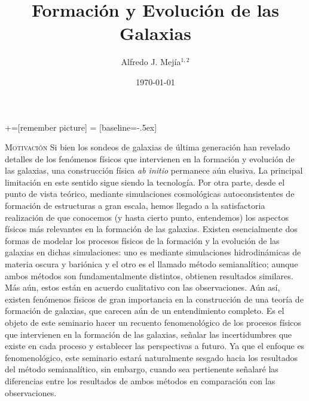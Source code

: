 \documentclass[xcolor=dvipsnames,4pt,hyperref={colorlinks,citecolor=black,linkcolor=black,urlcolor=black}]{beamer}
\begin{document}
+=[remember picture]
 = [baseline=-.5ex]

\begin{frame}
\title{Formación y Evolución de las Galaxias}
\author{Alfredo J. Mej\'ia$^{1,2}$}

\date{\today}


\maketitle
\end{frame}

\begin{frame}[allowframebreaks]{\textsc{Motivación}}
%
Si bien los sondeos de galaxias de última generación han revelado detalles de los fenómenos físicos
que intervienen en la formación y evolución de las galaxias, una construcción física \emph{ab
initio} permanece aún elusiva. La principal limitación en este sentido sigue siendo la tecnología.
Por otra parte, desde el punto de vista teórico, mediante simulaciones cosmológicas autoconsistentes
de formación de estructuras a gran escala, hemos llegado a la satisfactoria realización de que
conocemos (y hasta cierto punto, entendemos) los aspectos físicos más relevantes en la formación de
las galaxias. Existen esencialmente dos formas de modelar los procesos físicos de la formación y la
evolución de las galaxias en dichas simulaciones: uno es mediante simulaciones hidrodinámicas de
materia oscura y bariónica y el otro es el llamado método semianalítico; aunque ambos métodos son
fundamentalmente distintos, obtienen resultados similares. Más aún, estos están en acuerdo
cualitativo con las observaciones. Aún así, existen fenómenos físicos de gran importancia en la
construcción de una teoría de formación de galaxias, que carecen aún de un entendimiento completo.
Es el objeto de este seminario hacer un recuento fenomenológico de los procesos físicos que
intervienen en la formación de las galaxias, señalar las incertidumbres que existe en cada proceso y
establecer las perspectivas a futuro. Ya que el enfoque es fenomenológico, este seminario estará
naturalmente sesgado hacia los resultados del método semianalítico, sin embargo, cuando sea
pertienente señalaré las diferencias entre los resultados de ambos métodos en comparación con las
observaciones.
%
\end{frame}
\end{document}
